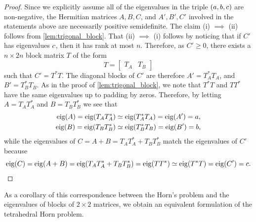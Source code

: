 \documentclass[notitlepage, 10pt]{article}
\begin{document}
\begin{proof}
    Since we explicitly assume all of the eigenvalues in the triple $(a,b,c)$ are non-negative, the Hermitian matrices $A,B,C$, and $A',B',C'$ involved in the statements above are necessarily positive semidefinite.
    The claim (i) $\implies$ (ii) follows from \cref{lem:trigonal_block}.
    That (ii) $\implies$ (i) follows by noticing that if $C'$ has eigenvalues $c$, then it has rank at most $n$.
    Therefore, as $C' \geq 0$, there exists a $n\times 2n$ block matrix $T$ of the form
    \begin{equation}
        T = \begin{bmatrix} T_{A} & T_{B} \end{bmatrix} 
    \end{equation}
    such that $C' = T^{*} T$. 
    The diagonal blocks of $C'$ are therefore $A' = T_{A}^*T_{A}$, and $B' = T_{B}^{*}T_{B}$.
    As in the proof of \cref{lem:trigonal_block}, we note that $T^{*}T$ and $TT^{*}$ have the same eigenvalues up to padding by zeros.
    Therefore, by letting $A = T_{A} T_{A}^{*}$ and $B = T_{B} T_{B}^*$ we see that 
    \begin{align}
        \begin{split}
            \operatorname{eig}(A) = \operatorname{eig}(T_{A} T_{A}^{*}) &\simeq \operatorname{eig}(T_{A}^{*} T_{A}) = \operatorname{eig}(A') = a, \\
            \operatorname{eig}(B) = \operatorname{eig}(T_{B} T_{B}^{*}) &\simeq \operatorname{eig}(T_{B}^{*} T_{B}) = \operatorname{eig}(B') = b,
        \end{split}
    \end{align}
    while the eigenvalues of $C = A+B = T_{A} T_{A}^{*} + T_{B} T_{B}^*$ match the eigenvalues of $C'$ because
    \begin{equation}
        \operatorname{eig}(C) = \operatorname{eig}(A+B) =\operatorname{eig}(T_{A} T_{A}^{*} + T_{B} T_{B}^*) = \operatorname{eig}(T T^{*}) \simeq \operatorname{eig}(T^{*}T) = \operatorname{eig}(C') = c.
    \end{equation}
\end{proof}

As a corollary of this correspondence between the Horn's problem and the eigenvalues of blocks of $2\times 2$ matrices, we obtain an equivalent formulation of the tetrahedral Horn problem.
\end{document}
